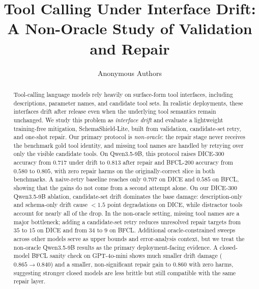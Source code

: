 \documentclass[runningheads]{llncs}
\newcommand{\method}{SchemaShield-Lite\xspace}
\begin{document}
\title{Tool Calling Under Interface Drift: A Non-Oracle Study of Validation and Repair}

\author{Anonymous Authors}

\maketitle

\begin{abstract}
Tool-calling language models rely heavily on surface-form tool interfaces, including
descriptions, parameter names, and candidate tool sets. In realistic deployments,
these interfaces drift after release even when the underlying tool semantics remain
unchanged. We study this problem as \emph{interface drift} and evaluate a lightweight
training-free mitigation, \method, built from validation, candidate-set retry,
and one-shot repair. Our primary protocol is \emph{non-oracle}: the repair stage
never receives the benchmark gold tool identity, and missing tool names are handled
by retrying over only the visible candidate tools. On Qwen3.5-9B, this protocol
raises DICE-300 accuracy from $0.717$ under drift to $0.813$ after repair and
BFCL-200 accuracy from $0.580$ to $0.805$, with zero repair harms on the
originally-correct slice in both benchmarks. A naive-retry baseline reaches only
$0.707$ on DICE and $0.585$ on BFCL, showing that the gains do not come from a
second attempt alone. On our DICE-300 Qwen3.5-9B ablation, candidate-set drift
dominates the base damage: description-only and schema-only drift cause $< 1.5$ point
degradations on DICE, while distractor tools account for nearly all of the drop.
In the non-oracle setting, missing tool names are a major bottleneck; adding a
candidate-set retry reduces unresolved repair targets from $35$ to $15$ on DICE
and from $34$ to $9$ on BFCL. Additional oracle-constrained sweeps across other
models serve as upper bounds and error-analysis context, but we treat the
non-oracle Qwen3.5-9B results as the primary deployment-facing evidence. A
closed-model BFCL sanity check on GPT-4o-mini shows much smaller drift damage
($0.865 \rightarrow 0.840$) and a smaller, non-significant repair gain to $0.860$
with zero harms, suggesting stronger closed models are less brittle but still
compatible with the same repair layer.
\end{abstract}
\end{document}

